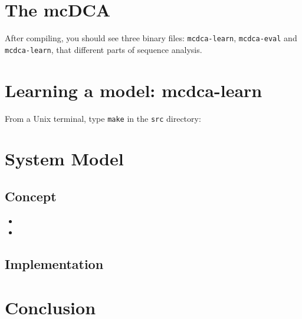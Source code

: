 \documentclass[a4paper,onecolumn]{article}
\begin{document}
\section{The mcDCA }
\label{sec:executables}
After compiling, you should see three binary files: \verb|mcdca-learn|, \verb|mcdca-eval| and \verb|mcdca-learn|,
that different parts of sequence analysis.

\section{Learning a model: mcdca-learn}
From a Unix terminal, type \verb|make| in the \verb|src| directory:

\section{System Model}
\label{sec:system-model}

\subsection{Concept}
\lipsum[1]\cite{asimov1951foundation}

\begin{itemize}
	\item \lipsum[53]
	\item \lipsum[11]
\end{itemize}

\lipsum[43]

\subsection{Implementation}
\lipsum[2]

\section{Conclusion}
\label{sec:conclusion}

\lipsum[9-10]


\end{document}
